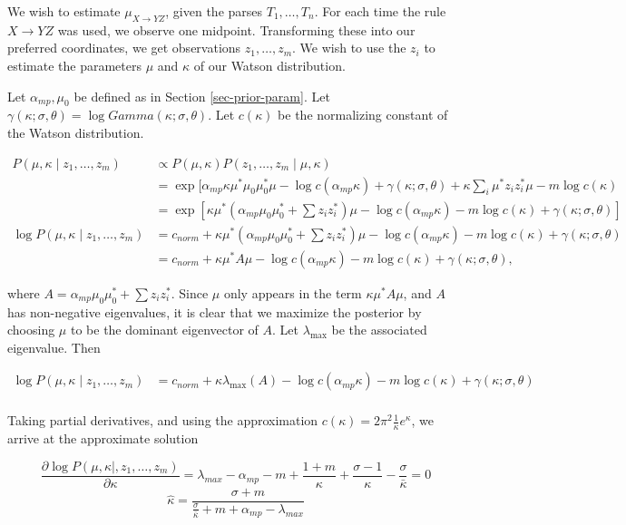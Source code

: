 \documentclass{article}
\begin{document}
We wish to estimate $\mu_{X\to YZ}$, given the parses $T_1, \dots,
T_n$. For each time the rule $X\to YZ$ was used, we observe one
midpoint. Transforming these into our preferred coordinates, we get
observations $z_1, \dots, z_m$. We wish to use the $z_i$ to estimate
the parameters $\mu$ and $\kappa$ of our Watson distribution.

Let $\alpha_{mp}, \mu_0$ be defined as in Section
\ref{sec-prior-param}. Let $\gamma(\kappa;\sigma,\theta) = \log
Gamma(\kappa; \sigma,\theta)$.  Let $c(\kappa)$ be the normalizing constant
of the Watson distribution.

\begin{align*}
P(\mu, \kappa \mid z_1,\dots,z_m) &\propto
P(\mu, \kappa) P(z_1,\dots,z_m\mid \mu, \kappa) \\
&= \exp[ \alpha_{mp}\kappa \mu^* \mu_0 \mu_0^* \mu
- \log c(\alpha_{mp} \kappa) + \gamma(\kappa; \sigma,\theta)
+ \kappa \sum_i \mu^* z_i z_i^* \mu - m \log c(\kappa)
\\
&= \exp[
\kappa \mu^* (\alpha_{mp} \mu_0 \mu_0^* + \sum z_i z_i^*)\mu
- \log c(\alpha_{mp} \kappa) - m \log c(\kappa) + 
\gamma(\kappa; \sigma, \theta) ]\\
\log P(\mu, \kappa \mid z_1,\dots,z_m) &= 
c_{norm} + 
\kappa \mu^* (\alpha_{mp} \mu_0 \mu_0^* + \sum z_i z_i^*)\mu
- \log c(\alpha_{mp} \kappa) - m \log c(\kappa) + 
\gamma(\kappa; \sigma, \theta) \\
&= c_{norm} + 
\kappa \mu^* A \mu
- \log c(\alpha_{mp} \kappa) - m \log c(\kappa) + 
\gamma(\kappa; \sigma, \theta),
\end{align*}

where $A = \alpha_{mp} \mu_0 \mu_0^* + \sum z_i z_i^*$.
Since $\mu$ only appears in the term $\kappa \mu^* A \mu$,
and $A$ has non-negative eigenvalues, it is clear
that we maximize the posterior by choosing $\mu$ to be
the dominant eigenvector of $A$.
Let $\lambda_{\max}$ be the associated eigenvalue. Then

\begin{align*}
\log P(\mu, \kappa \mid z_1,\dots,z_m) &= 
c_{norm} + \kappa \lambda_{\max}(A) - 
\log c(\alpha_{mp} \kappa) - m \log c(\kappa) + 
\gamma(\kappa; \sigma, \theta)\\
\end{align*}

Taking partial derivatives, and using the approximation
$c(\kappa) = 2 \pi^2 \frac{1}{\kappa} e^\kappa$,
we arrive at the approximate solution

$$
\frac{\partial \log P(\mu, \kappa \mid, z_1,\dots,z_m)}
{\partial \kappa} = 
\lambda_{max} - \alpha_{mp} -m + \frac{1+m}{\kappa} + 
\frac{\sigma-1}{\kappa} - \frac{\sigma}{\bar{\kappa}} = 0
$$
$$
\widehat{\kappa} = \frac{\sigma+m}{\frac{\sigma}{\bar{\kappa}}
+ m + \alpha_{mp} - \lambda_{max}}
$$
\end{document}
